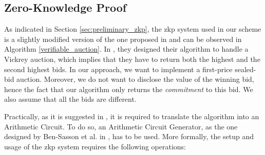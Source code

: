 \subsection{Zero-Knowledge Proof}
As indicated in Section \ref{sec:preliminary_zkp}, the \gls{zkp} system used in our scheme is a slightly modified version of the one proposed in \cite{galal2018succinctly} and can be observed in Algorithm \ref{verifiable_auction}. In \cite{galal2018succinctly}, they designed their algorithm to handle a Vickrey auction, which implies that they have to return both the highest and the second highest bids. In our approach, we want to implement a first-price sealed-bid auction. Moreover, we do not want to disclose the value of the winning bid, hence the fact that our algorithm only returns the \textit{commitment} to this bid. We also assume that all the bids are different. 

Practically, as it is suggested in \cite{galal2018succinctly}, it is required to translate the algorithm into an Arithmetic Circuit. To do so, an Arithmetic Circuit Generator, as the one designed by Ben-Sasson et al. in \cite{2014ben-sasson}, has to be used. More formally, the setup and usage of the \gls{zkp} system requires the following operations:


